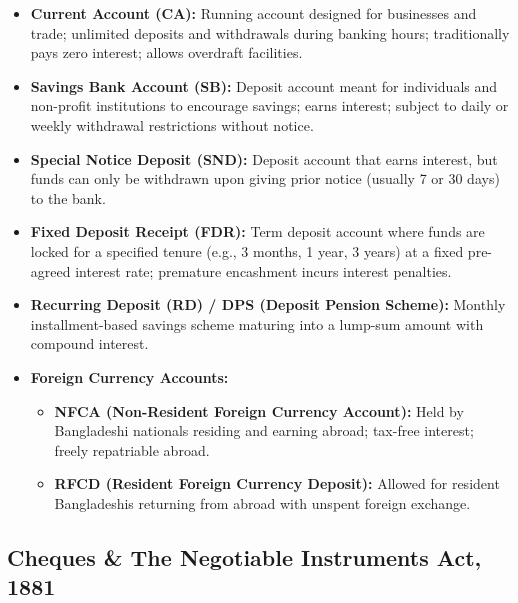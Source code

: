 \begin{itemize}
  \item \textbf{Current Account (CA):} Running account designed for businesses and trade; unlimited deposits and withdrawals during banking hours; traditionally pays zero interest; allows overdraft facilities.
  \item \textbf{Savings Bank Account (SB):} Deposit account meant for individuals and non-profit institutions to encourage savings; earns interest; subject to daily or weekly withdrawal restrictions without notice.
  \item \textbf{Special Notice Deposit (SND):} Deposit account that earns interest, but funds can only be withdrawn upon giving prior notice (usually 7 or 30 days) to the bank.
  \item \textbf{Fixed Deposit Receipt (FDR):} Term deposit account where funds are locked for a specified tenure (e.g., 3 months, 1 year, 3 years) at a fixed pre-agreed interest rate; premature encashment incurs interest penalties.
  \item \textbf{Recurring Deposit (RD) / DPS (Deposit Pension Scheme):} Monthly installment-based savings scheme maturing into a lump-sum amount with compound interest.
  \item \textbf{Foreign Currency Accounts:}
  \begin{itemize}
    \item \textbf{NFCA (Non-Resident Foreign Currency Account):} Held by Bangladeshi nationals residing and earning abroad; tax-free interest; freely repatriable abroad.
    \item \textbf{RFCD (Resident Foreign Currency Deposit):} Allowed for resident Bangladeshis returning from abroad with unspent foreign exchange.
  \end{itemize}
\end{itemize}

\medskip

\subsection{Cheques \& The Negotiable Instruments Act, 1881}

